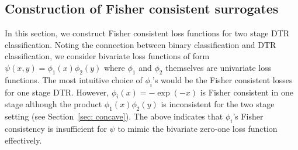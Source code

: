 \documentclass[preprint] {imsart}
\begin{document}
{ 
 
 
 
% 
 

}
 \subsection{Construction of Fisher consistent surrogates}
 \label{sec: fisher consistent surrogate}
 In this section, we construct  Fisher consistent loss functions for two stage DTR classification.
 Noting the connection between binary classification and DTR classification, we consider bivariate loss functions of form $\psi(x,y)=\phi_1(x)\phi_2(y)$ where $\phi_1$ and $\phi_2$ themselves are univariate loss functions. The most intuitive choice of $\phi_i$'s would be the Fisher consistent losses for  one stage DTR. However,  $\phi_i(x)=-\exp(-x)$ is Fisher consistent in one stage \citep{bartlett2006, chen2017} although the product $\phi_1(x)\phi_2(y)$ is inconsistent for the two stage setting (see Section~\ref{sec: concave}). The above indicates that $\phi_i$'s Fisher consistency is insufficient for $\psi$ to mimic the bivariate zero-one loss function effectively.
 
\end{document}
